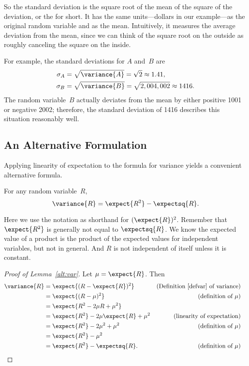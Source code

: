 So the standard deviation is the square root of the mean of the square
of the deviation, or the  for short.  It has
the same units---dollars in our example---as the original random
variable and as the mean.  Intuitively, it measures the average
deviation from the mean, since we can think of the square root on the
outside as roughly canceling the square on the inside.

For example, the standard deviations for $A$ and~$B$ are
\begin{align*}
    \sigma_A & = \sqrt{\variance{A}} = \sqrt{2} \approx 1.41, \\
    \sigma_B & = \sqrt{\variance{B}} = \sqrt{2,004,002} \approx 1416.
\end{align*}
The random variable~$B$ actually deviates from the mean by either
positive 1001 or negative 2002; therefore, the standard deviation of
1416 describes this situation reasonably well.

\subsection{An Alternative Formulation}

Applying linearity of expectation to the formula for variance yields a
convenient alternative formula.
\begin{lemma}\label{alt:var}
For any random variable~$R$,
\[
    \variance{R} = \expect{R^2} - \expectsq{R}.
\]
\end{lemma}
Here we use the notation  as shorthand for
$(\expect{R})^2$.  Remember that $\expect{R^2}$ is generally not equal
to $\expectsq{R}$.  We know the expected value of a product is the
product of the expected values for independent variables, but not in
general.  And $R$ is not independent of itself unless it is constant.

\begin{proof}[Proof of Lemma~\ref{alt:var}]
Let $\mu = \expect{R}$.  Then
\begin{align*}
\variance{R} & =   \expect{(R - \expect{R})^2}
               & \text{(Definition~\ref{defvar} of variance)}\\
        & = \expect{(R - \mu)^2} & \text{(definition of $\mu$)}\\
        & = \expect{R^2 - 2  \mu R + \mu^2} \\
        & = \expect{R^2} - 2 \mu \expect{R} + \mu^2
                & \text{(linearity of expectation)}\\
        & = \expect{R^2} - 2 \mu^2 + \mu^2
              &  \text{(definition of $\mu$)}\\
        & = \expect{R^2} - \mu^2\\
        & = \expect{R^2} - \expectsq{R}.
                  &  \text{(definition of $\mu$)} & \qedhere
\end{align*}
\end{proof}

